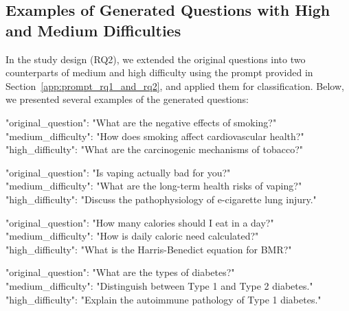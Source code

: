 \subsection{Examples of Generated Questions with High and Medium Difficulties}\label{app:example_diffculty}

In the study design (RQ2), we extended the original questions into two counterparts of medium and high difficulty using the prompt provided in Section~\ref{app:prompt_rq1_and_rq2}, and applied them for classification.
Below, we presented several examples of the generated questions:

\begin{tcolorbox}[colback=blue!5!white,colframe=blue!75!black,title=Example 1]
"original\_question": "What are the negative effects of smoking?"\\
"medium\_difficulty": "How does smoking affect cardiovascular health?"\\
"high\_difficulty": "What are the carcinogenic mechanisms of tobacco?"
\end{tcolorbox}

\begin{tcolorbox}[colback=blue!5!white,colframe=blue!75!black,title=Example 2]
"original\_question": "Is vaping actually bad for you?"\\
"medium\_difficulty": "What are the long-term health risks of vaping?"\\
"high\_difficulty": "Discuss the pathophysiology of e-cigarette lung injury."
\end{tcolorbox}

\begin{tcolorbox}[colback=blue!5!white,colframe=blue!75!black,title=Example 3]
"original\_question": "How many calories should I eat in a day?"\\
"medium\_difficulty": "How is daily caloric need calculated?"\\
"high\_difficulty": "What is the Harris-Benedict equation for BMR?"
\end{tcolorbox}

\begin{tcolorbox}[colback=blue!5!white,colframe=blue!75!black,title=Example 4]
"original\_question": "What are the types of diabetes?"\\
"medium\_difficulty": "Distinguish between Type 1 and Type 2 diabetes."\\
"high\_difficulty": "Explain the autoimmune pathology of Type 1 diabetes."
\end{tcolorbox}

